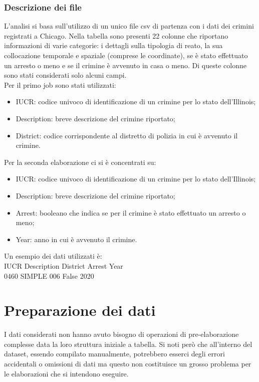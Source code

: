 \documentclass[10pt]{article}
\begin{document}
\subsubsection{Descrizione dei file}
L'analisi si basa sull'utilizzo di un unico file csv di partenza con i dati dei crimini registrati a Chicago.
Nella tabella sono presenti 22 colonne che riportano informazioni di varie categorie: i dettagli sulla tipologia di reato, la sua collocazione temporale e spaziale (comprese le coordinate), se è stato effettuato un arresto o meno e se il crimine è avvenuto in casa o meno. Di queste colonne sono stati considerati solo alcuni campi.\\
Per il primo job sono stati utilizzati:
\begin{itemize}
\item IUCR: codice univoco di identificazione di un crimine per lo stato dell'Illinois;
\item Description: breve descrizione del crimine riportato;
\item District: codice corrispondente al distretto di polizia in cui è avvenuto il crimine.
\end{itemize}
Per la seconda elaborazione ci si è concentrati su:
\begin{itemize}
\item IUCR: codice univoco di identificazione di un crimine per lo stato dell'Illinois;
\item Description: breve descrizione del crimine riportato;
\item Arrest: booleano che indica se per il crimine è stato effettuato un arresto o meno;
\item Year: anno in cui è avvenuto il crimine.
\end{itemize}

Un esempio dei dati utilizzati è:\\
IUCR Description District Arrest Year \\
0460   SIMPLE      006    False  2020



\section{Preparazione dei dati}
I dati considerati non hanno avuto bisogno di operazioni di pre-elaborazione complesse data la loro struttura iniziale a tabella. Si noti però che all'interno del dataset, essendo compilato manualmente, potrebbero esserci degli errori accidentali o omissioni di dati ma questo non costituisce un grosso problema per le elaborazioni che si intendono eseguire. \\
\end{document}
